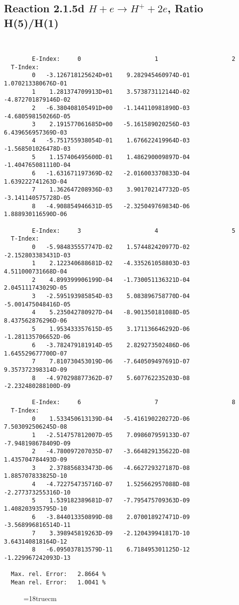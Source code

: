 \newpage
\subsection{
Reaction 2.1.5d  $H + e \rightarrow H^+ + 2e$, Ratio H(5)/H(1)
}


\begin{verbatim}


        E-Index:     0                     1                     2
  T-Index:
        0   -3.126718125624D+01    9.282945460974D-01    1.070213380676D-01
        1    1.281374709913D+01    3.573873112144D-02   -4.872701879146D-02
        2   -6.380408105491D+00   -1.144110981890D-03   -4.680598150266D-05
        3    2.191577061685D+00   -5.161589020256D-03    6.439656957369D-03
        4   -5.751755938054D-01    1.676622419964D-03   -1.568501026478D-03
        5    1.157406495600D-01    1.486290009897D-04   -1.404765081110D-04
        6   -1.631671197369D-02   -2.016003370833D-04    1.639222741263D-04
        7    1.362647208936D-03    3.901702147732D-05   -3.141140575728D-05
        8   -4.908854946631D-05   -2.325049769834D-06    1.888930116590D-06

        E-Index:     3                     4                     5
  T-Index:
        0   -5.984835557747D-02    1.574482420977D-02   -2.152803383431D-03
        1    2.122340688681D-02   -4.335261058803D-03    4.511000731668D-04
        2    4.899399906199D-04   -1.730051136321D-04    2.045111743029D-05
        3   -2.595193985854D-03    5.083896758770D-04   -5.001475048416D-05
        4    5.235042780927D-04   -8.901350181088D-05    8.437562876296D-06
        5    1.953433357615D-05    3.171136646292D-06   -1.281135706652D-06
        6   -3.782479181914D-05    2.829273502486D-06    1.645529677700D-07
        7    7.810730453019D-06   -7.640509497691D-07    9.357372398314D-09
        8   -4.970298877362D-07    5.607762235203D-08   -2.232480288100D-09

        E-Index:     6                     7                     8
  T-Index:
        0    1.533450613139D-04   -5.416190220272D-06    7.503092506245D-08
        1   -2.514757812007D-05    7.098607959133D-07   -7.948198678409D-09
        2   -4.780097207035D-07   -3.664829135622D-08    1.435704784493D-09
        3    2.378856833473D-06   -4.662729327187D-08    1.885707833825D-10
        4   -4.722754735716D-07    1.525662957088D-08   -2.277373255316D-10
        5    1.539182389681D-07   -7.795475709363D-09    1.408203935795D-10
        6   -3.844013350899D-08    2.070018927471D-09   -3.568996816514D-11
        7    3.398945819263D-09   -2.120439941817D-10    3.643140818164D-12
        8   -6.095037813579D-11    6.718495301125D-12   -1.229967242093D-13

  Max. rel. Error:   2.8664 %
  Mean rel. Error:   1.0041 %

\end{verbatim}
\begin{figure} \label{2.1.5d}
\epsfxsize=18truecm
\end{figure}

